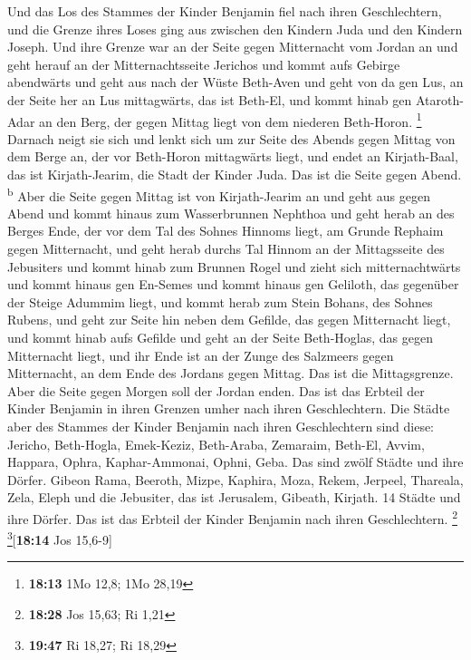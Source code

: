  Und das Los des Stammes der Kinder Benjamin fiel nach
ihren Geschlechtern, und die Grenze ihres Loses ging aus zwischen den
Kindern Juda und den Kindern Joseph.  Und ihre Grenze war
an der Seite gegen Mitternacht vom Jordan an und geht herauf an der
Mitternachtsseite Jerichos und kommt aufs Gebirge abendwärts und geht
aus nach der Wüste Beth-Aven  und geht von da gen Lus, an
der Seite her an Lus mittagwärts, das ist Beth-El, und kommt hinab gen
Ataroth-Adar an den Berg, der gegen Mittag liegt von dem niederen
Beth-Horon. \footnote{\textbf{18:13} 1Mo 12,8; 1Mo 28,19}
 Darnach neigt sie sich und lenkt sich um zur Seite des
Abends gegen Mittag von dem Berge an, der vor Beth-Horon mittagwärts
liegt, und endet an Kirjath-Baal, das ist Kirjath-Jearim, die Stadt der
Kinder Juda. Das ist die Seite gegen Abend. \textsuperscript{b}
 Aber die Seite gegen Mittag ist von Kirjath-Jearim an
und geht aus gegen Abend und kommt hinaus zum Wasserbrunnen Nephthoa
 und geht herab an des Berges Ende, der vor dem Tal des
Sohnes Hinnoms liegt, am Grunde Rephaim gegen Mitternacht, und geht
herab durchs Tal Hinnom an der Mittagsseite des Jebusiters und kommt
hinab zum Brunnen Rogel  und zieht sich mitternachtwärts
und kommt hinaus gen En-Semes und kommt hinaus gen Geliloth, das
gegenüber der Steige Adummim liegt, und kommt herab zum Stein Bohans,
des Sohnes Rubens,  und geht zur Seite hin neben dem
Gefilde, das gegen Mitternacht liegt, und kommt hinab aufs Gefilde
 und geht an der Seite Beth-Hoglas, das gegen Mitternacht
liegt, und ihr Ende ist an der Zunge des Salzmeers gegen Mitternacht, an
dem Ende des Jordans gegen Mittag. Das ist die Mittagsgrenze.
 Aber die Seite gegen Morgen soll der Jordan enden. Das
ist das Erbteil der Kinder Benjamin in ihren Grenzen umher nach ihren
Geschlechtern.  Die Städte aber des Stammes der Kinder
Benjamin nach ihren Geschlechtern sind diese: Jericho, Beth-Hogla,
Emek-Keziz,  Beth-Araba, Zemaraim, Beth-El,
 Avvim, Happara, Ophra,  Kaphar-Ammonai,
Ophni, Geba. Das sind zwölf Städte und ihre Dörfer. 
Gibeon Rama, Beeroth,  Mizpe, Kaphira, Moza,
 Rekem, Jerpeel, Thareala,  Zela, Eleph
und die Jebusiter, das ist Jerusalem, Gibeath, Kirjath. 14 Städte und
ihre Dörfer. Das ist das Erbteil der Kinder Benjamin nach ihren
Geschlechtern. \footnote{\textbf{18:28} Jos 15,63; Ri 1,21}
\footnote{\textbf{19:47} Ri 18,27; Ri 18,29}{[}\textbf{18:14} Jos
15,6-9{]}

